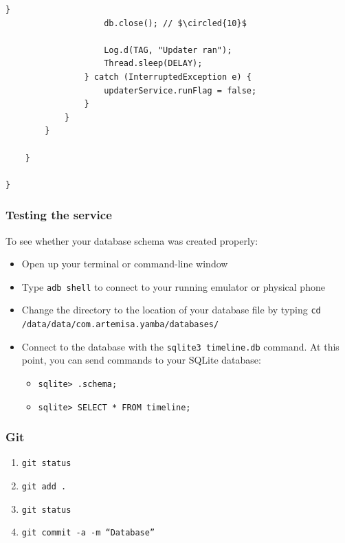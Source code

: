 \begin{frame}
\begin{lstlisting}[caption=src/com/artemisa/yamba/UpdaterService.java, basicstyle=\tiny,escapechar= $]
					}
					db.close(); // $\circled{10}$

					Log.d(TAG, "Updater ran");
					Thread.sleep(DELAY);
				} catch (InterruptedException e) {
					updaterService.runFlag = false;
				}
			}
		}

	}

}

\end{lstlisting}
\end{frame}
\begin{frame}
\frametitle{Testing the service}
To see whether your database schema was created properly:
\begin{itemize}
\item Open up your terminal or command-line window
\item Type \texttt{adb shell} to connect to your running emulator or physical phone
\item Change the directory to the location of your database file by typing \texttt{cd /data/data/com.artemisa.yamba/databases/}
\item Connect to the database with the \texttt{sqlite3 timeline.db} command. At this point, you can send commands to your SQLite database:
\begin{itemize}
\item \texttt{sqlite> .schema;}
\item \texttt{sqlite> SELECT * FROM timeline;}
\end{itemize}
\end{itemize}

\end{frame}
\begin{frame}[fragile]
\frametitle{Git}
\begin{enumerate}
\item \texttt{git status}
\item \texttt{git add .}
\item \texttt{git status}
\item \texttt{git commit -a -m ``Database''}
\end{enumerate}

\end{frame}
